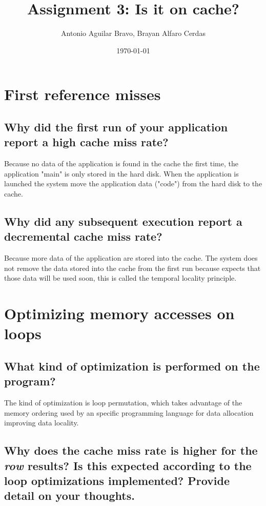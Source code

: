 \documentclass[12pt]{article}%
\begin{document}
\title{Assignment 3: Is it on cache?}

\author{Antonio Aguilar Bravo, Brayan Alfaro Cerdas }

\date{\today}
\maketitle


\section{First reference misses}

        
\subsection{Why did the first run of your application report a high cache miss rate?}

Because no data of the application is found in the cache the first time, the application "main" is only stored in the hard disk. When the application is launched the system move the application data ("code") from the hard disk to the cache.  


\subsection{Why did any subsequent execution report a decremental cache miss rate?}

Because more data of the application are stored into the cache. The system does not remove the data stored into the cache from the first run because expects that those data will be used soon, this is called the temporal locality principle.   



\section{Optimizing memory accesses on loops}


\subsection {What kind of optimization is performed on the program?}

The kind of optimization is loop permutation, which takes advantage of the memory ordering used by an specific programming language for data allocation improving data locality.

\subsection {Why does the cache miss rate is higher for the \textit{row} results? Is this expected according to the loop optimizations implemented? Provide detail on your thoughts.}
\end{document}
